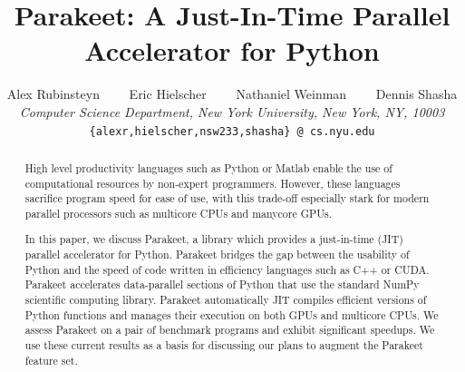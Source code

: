 \documentclass[10pt,twocolumn]{article}
\begin{document}
\title{Parakeet: A Just-In-Time Parallel Accelerator for Python}
\author{
Alex Rubinsteyn \ \ \ \ Eric Hielscher \ \ \ \ Nathaniel Weinman \ \ \ \
Dennis Shasha \\
{\it Computer Science Department, New York University, New York, NY, 10003} \\
\small{\tt \{alexr,hielscher,nsw233,shasha\} @ cs.nyu.edu}
}
\date{}

\newcommand{\WITH}{\impfnt{with}}
\newcommand{\VALUES}{\impfnt{values}}
\newcommand{\MAP}{\impfnt{map}}
\newcommand{\REDUCE}{\impfnt{reduce}}
\newcommand{\ALLPAIRS}{\impfnt{allpairs}}
\newcommand{\CAST}{\impfnt{cast}}
\newcommand{\APPLY}{\impfnt{apply}}
\newcommand{\INDEX}{\impfnt{index}}
\newcommand{\SCAN}{\impfnt{scan}}
\newcommand{\THREADIDX}{\impfnt{threadIdx}}
\newcommand{\BLOCKIDX}{\impfnt{blockIdx}}
\newcommand{\BLOCKDIM}{\impfnt{blockDim}}
\newcommand{\GRIDDIM}{\impfnt{gridDim}}
\newcommand{\VEC}{\impfnt{vec}}
\newcommand{\concat}{\ensuremath{+\!\!\!\!+\,}}

\setlength\fboxsep{8pt}
\setlength\fboxrule{0.5pt}

\maketitle

\begin{abstract}

High level productivity languages such as Python or Matlab enable the use of computational resources by non-expert programmers.  However, these languages sacrifice program speed for ease of use, with this trade-off especially stark for modern parallel processors such as multicore CPUs and manycore GPUs.

In this paper, we discuss Parakeet, a library which provides a just-in-time (JIT) parallel accelerator for Python.  Parakeet bridges the gap between the usability of Python and the speed of code written in efficiency languages such as C++ or CUDA.  Parakeet accelerates data-parallel sections of Python that use the standard NumPy scientific computing library.  Parakeet automatically JIT compiles efficient versions of Python functions and manages their execution on both GPUs and multicore CPUs.  We assess Parakeet on a pair of benchmark programs and exhibit significant speedups.  We use these current results as a basis for discussing our plans to augment the Parakeet feature set.
\end{abstract}
\end{document}
